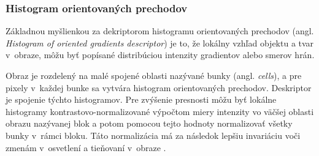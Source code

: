 \subsubsection{Histogram orientovaných prechodov}
Základnou myšlienkou za dekriptorom histogramu orientovaných prechodov (angl. \textit{Histogram of oriented gradients descriptor}) je to, že lokálny vzhľad objektu a tvar v~obraze, môžu byť popísané
	distribúciou intenzity gradientov alebo smerov hrán.

Obraz je rozdelený na malé spojené oblasti nazývané bunky (angl. \textit{cells}), a pre pixely v~každej bunke sa vytvára histogram orientovaných prechodov.
Deskriptor je spojenie týchto histogramov.
Pre zvýšenie presnosti môžu byť lokálne histogramy kontrastovo-normalizované výpočtom miery intenzity vo väčšej oblasti obrazu nazývanej blok a potom
	pomocou tejto hodnoty normalizovať všetky bunky v~rámci bloku.
Táto normalizácia má za následok lepšiu invariáciu voči zmenám v~osvetlení a tieňovaní v~obraze \cite{prop:HOG}.

\begin{comment}
	\subsubsection{Priemerna štandartná odchýlka vstupných údajov}
	Je užitočné vytvoriť si tzv. ``stredný obraz'' získaný priemernými hodnotami pre každý pixel zo všetkých trénovacích dát.
	Timto spôsobom je možné vytvoriť si základný prehľad o~štruktúre vstupných dát.
	Na základe toho môžeme potom do vstupným dát pridať rôzne dalšie variácie klasifikovaných objektov pre lepšie generalizovanie klasifikátora \cite{odkaz:NNPreprocessing}.
\end{comment}

